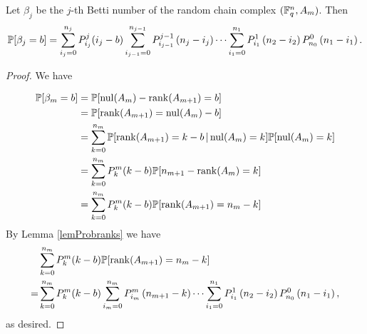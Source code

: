 \begin{theorem} Let $\beta_j$ be the $j$-th Betti number of the random chain complex $(\mathbb{F}_q^{n} , A_m)$. Then
	\[    
    \mathbb{P}[\beta_j = b] = \sum_{i_j=0}^{n_{j}} P_{i_j}^{j}(i_j-b)
    \sum_{i_{j-1}=0}^{n_{j-1}} P_{i_{j-1}}^{j-1}\left(n_{j} -i_j\right)
		\cdots
	\sum_{i_1 = 0}^{n_1} P_{i_1}^1\left(n_2 - i_2\right) P_{n_0}^0 \left(n_1 - i_1\right).
    \]
\end{theorem}
\begin{proof}
We have

\begin{align*}
  \mathbb{P}[\beta_{m} = b] 
   &= \mathbb{P}[\mathrm{nul}(A_{m}) - \operatorname{\mathrm{rank}}(A_{m+1}) = b]\\
   &= \mathbb{P}[\operatorname{\mathrm{rank}}(A_{m+1}) = \mathrm{nul}(A_{m}) - b]\\
   &= \sum_{k=0}^{n_{m}}\mathbb{P}[\operatorname{\mathrm{rank}}(A_{m+1}) = k - b\,|\, \mathrm{nul}(A_{m})=k] \mathbb{P}[\mathrm{nul}(A_{m}) = k]\\
   &= \sum_{k=0}^{n_{m}} P_{k}^{m}(k-b)\mathbb{P}[n_{m+1} - \operatorname{\mathrm{rank}}(A_{m}) = k]\\
   &= \sum_{k=0}^{n_{m}} P_{k}^{m}(k-b)\mathbb{P}[\operatorname{\mathrm{rank}}(A_{m+1}) = n_{m} - k]\\ 
\end{align*}
By Lemma \ref{lemProbranks} we have
\begin{align*}
 & \sum_{k=0}^{n_{m}} P_{k}^{m}(k-b)\mathbb{P}[\operatorname{\mathrm{rank}}(A_{m+1}) = n_{m} - k] \\
=& \sum_{k=0}^{n_{m}} P_{k}^{m}(k-b)\sum_{i_m=0}^{n_m} P_{i_m}^{m}\left(n_{m+1} -k\right)
		\cdots
	\sum_{i_1 = 0}^{n_1} P_{i_1}^1\left(n_2 - i_2\right) P_{n_0}^0 \left(n_1 - i_1\right), 
\end{align*}
as desired.
\end{proof}
